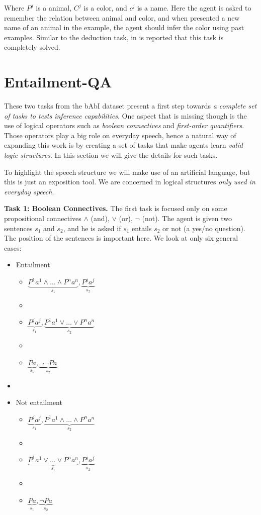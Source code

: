 Where $P^{j}$ is a animal, $C^{j}$ is a color, and $c^{j}$ is a name. Here the agent is asked to remember the relation between animal and color, and when presented a new name of an animal in the example, the agent should infer the color using past examples. Similar to the deduction task, in \cite{WestonBCM15} is reported that this task is completely solved.

\section{Entailment-QA}
\label{ch:03-EQA}

These two tasks from the bAbI dataset present a first step towards \textit{a complete set of tasks to tests inference capabilities}. One aspect that is missing though is the use of logical operators such as \textit{boolean connectives} and \textit{first-order quantifiers}. Those operators play a big role on everyday speech, hence a natural way of expanding this work is by creating a set of tasks that make agents learn \textit{valid logic structures}. In this section we will give the details for such tasks. 

To highlight the speech structure we will make use of an artificial language, but this is just an exposition tool. We are concerned in logical structures \textit{only used in everyday speech}.

\textbf{Task 1: Boolean Connectives.} The first task is focused only on some propositional connectives $\land$ (and), $\lor$ (or), $\lnot$ (not). The agent is given two sentences $s_1$ and $s_2$, and he is asked if $s_1$ entails $s_2$ or not (a yes/no question). The position of the sentences is important here. We look at only six general cases:

\begin{itemize}
\item Entailment
\begin{itemize}
\item $\underbrace{P^{1}a^1 \land \dots \land P^{n}a^n}_{s_1}, \underbrace{P^{j}a^j}_{s_2}$ 
\item[]
\item $\underbrace{P^{j}a^j}_{s_1}, \underbrace{P^{1}a^1 \lor \dots \lor P^{n}a^n}_{s_2}$
\item[]
\item $\underbrace{Pa}_{s_1}, \underbrace{\lnot \lnot Pa}_{s_2}$
\end{itemize}
\item[]

\item Not entailment
\begin{itemize}
\item $\underbrace{P^{j}a^j}_{s_1}, \underbrace{P^{1}a^1 \land \dots \land P^{n}a^n}_{s_2}$
\item[]
\item $\underbrace{P^{1}a^1 \lor \dots \lor P^{n}a^n}_{s_1}, \underbrace{P^{j}a^j}_{s_2}$
\item[]
\item $\underbrace{Pa}_{s_1}, \underbrace{\lnot Pa}_{s_2}$
\end{itemize}
\end{itemize}

